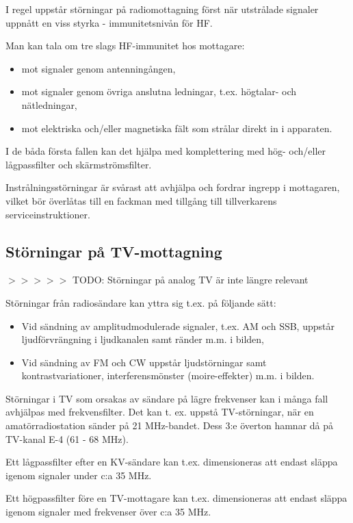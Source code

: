 I regel uppstår störningar på radiomottagning först när utstrålade
signaler uppnått en viss styrka - immunitetsnivån för HF.

Man kan tala om tre slags HF-immunitet hos mottagare:
\begin{itemize}
\item mot signaler genom antenningången,
\item mot signaler genom övriga anslutna ledningar, t.ex. högtalar-
  och nätledningar,
\item mot elektriska och/eller magnetiska fält som strålar direkt in i
  apparaten.
\end{itemize}

I de båda första fallen kan det hjälpa med komplettering med hög-
och/eller lågpassfilter och skärmströmsfilter.

Instrålningsstörningar är svårast att avhjälpa och fordrar ingrepp i
mottagaren, vilket bör överlåtas till en fackman med tillgång till
tillverkarens serviceinstruktioner.

\subsection{Störningar på TV-mottagning}

$>>>>>$ TODO: Störningar på analog TV är inte längre relevant

Störningar från radiosändare kan yttra sig t.ex. på följande sätt:
\begin{itemize}
\item Vid sändning av amplitudmodulerade signaler, t.ex. AM och SSB,
  uppstår ljudförvrängning i ljudkanalen samt ränder m.m. i bilden,
\item Vid sändning av FM och CW uppstår ljudstörningar samt
  kontrastvariationer, interferensmönster (moire-effekter) m.m. i
  bilden.
\end{itemize}

Störningar i TV som orsakas av sändare på lägre frekvenser kan i många
fall avhjälpas med frekvensfilter. Det kan t. ex. uppstå
TV-störningar, när en amatörradiostation sänder på 21 MHz-bandet. Dess
3:e överton hamnar då på TV-kanal E-4 (61 - 68 MHz).

Ett lågpassfilter efter en KV-sändare kan t.ex. dimensioneras att
endast släppa igenom signaler under c:a 35 MHz.

Ett högpassfilter före en TV-mottagare kan t.ex. dimensioneras att
endast släppa igenom signaler med frekvenser över c:a 35 MHz.

